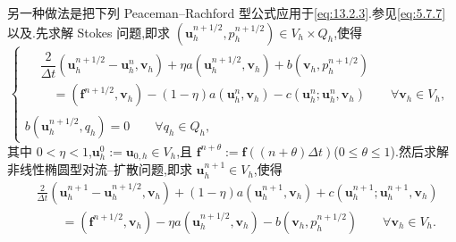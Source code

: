 另一种做法是把下列 Peaceman--Rachford 型公式应用于\eqref{eq:13.2.3}.参见\eqref{eq:5.7.7}以及.先求解 Stokes 问题,即求 \((\boldsymbol{u}_h^{n+1/2},p_h^{n+1/2})\in V_h\times Q_h\),使得
\begin{equation}\label{eq:13.5.15}
  \begin{cases}
    \begin{aligned}
      &\dfrac2{\Delta t}(\boldsymbol{u}_h^{n+1/2}-\boldsymbol{u}_h^n,\boldsymbol{v}_h)
        +\eta a(\boldsymbol{u}_h^{n+1/2},\boldsymbol{v}_h)+b(\boldsymbol{v}_h,p_h^{n+1/2})\\
      &\quad=(\boldsymbol{f}^{n+1/2},\boldsymbol{v}_h)-(1-\eta)a(\boldsymbol{u}_h^n,\boldsymbol{v}_h)
        -c(\boldsymbol{u}_h^n;\boldsymbol{u}_h^n,\boldsymbol{v}_h)
           \qquad\forall\boldsymbol{v}_h\in V_h,
    \end{aligned}\\[2pt]
    b(\boldsymbol{u}_h^{n+1/2},q_h)=0\qquad\forall q_h\in Q_h,
  \end{cases}
\end{equation}
其中 \(0<\eta<1\),\(\boldsymbol{u}_h^0:=\boldsymbol{u}_{0,h}\in V_h\),且 \(\boldsymbol{f}^{n+\theta}:=\boldsymbol{f}((n+\theta)\Delta t)\)(\(0\le\theta\le1\)).然后求解非线性椭圆型对流--扩散问题,即求 \(\boldsymbol{u}_h^{n+1}\in V_h\),使得
\begin{equation}\label{eq:13.5.16}
  \begin{aligned}
    &\frac2{\Delta t}(\boldsymbol{u}_h^{n+1}-\boldsymbol{u}_h^{n+1/2},\boldsymbol{v}_h)
      +(1-\eta)a(\boldsymbol{u}_h^{n+1},\boldsymbol{v}_h)
      +c(\boldsymbol{u}_h^{n+1};\boldsymbol{u}_h^{n+1},\boldsymbol{v}_h)\\
    &\qquad=(\boldsymbol{f}^{n+1/2},\boldsymbol{v}_h)-\eta a(\boldsymbol{u}_h^{n+1/2},\boldsymbol{v}_h)
      -b(\boldsymbol{v}_h,p_h^{n+1/2})\qquad\forall\boldsymbol{v}_h\in V_h.
  \end{aligned}
\end{equation}

